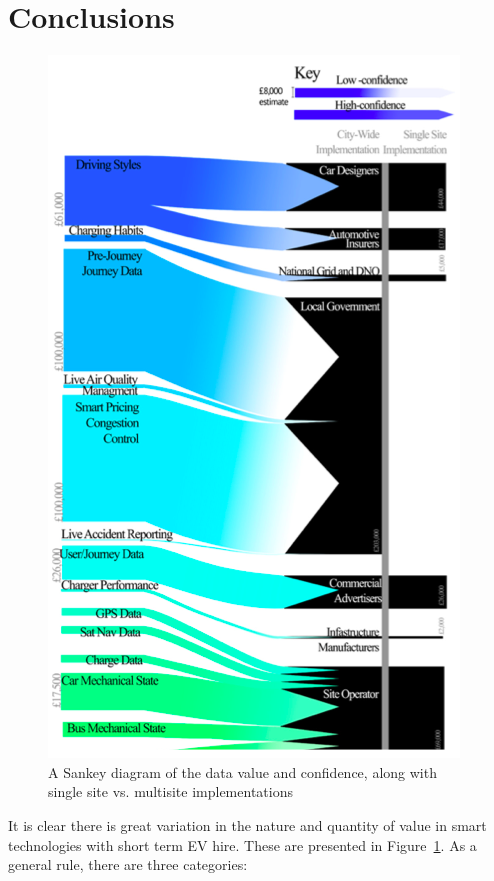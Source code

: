 \documentclass[journal]{IEEEtran}
\begin{document}
\section{Conclusions} 

\begin{figure}[!htp]
\centering
\includegraphics[width=\columnwidth]{images/sankey.png}
\caption{A Sankey diagram of the data value and confidence, along with
  single site vs. multisite implementations}
\label{fig:sankey}
\end{figure}

It is clear there is great variation in the nature and quantity of
value in smart technologies with short term EV hire. These are
presented in Figure~\ref{fig:sankey}. As a general rule, there are
three categories: 
\end{document}
